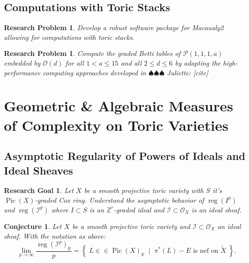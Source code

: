 \documentclass[11pt,reqno]{amsart}
\newtheorem{goal}[lemma]{Research Goal}
\newtheorem{problem}[lemma]{Research Problem}
\newtheorem{conjecture}[lemma]{Conjecture}
\theoremstyle{remark}
\newcommand{\reg}{\operatorname{reg}}
\newcommand{\Pic}{\operatorname{Pic}}
\newcommand{\RR}{\mathbb{R}}
\newcommand{\ZZ}{\mathbb{Z}}
\newcommand{\cI}{\mathcal{I}}
\newcommand{\cO}{\mathcal{O}}
\newcommand{\cP}{\mathcal{P}}
\newcommand{\juliette}[1]{{\color{red} \sf $\spadesuit\spadesuit\spadesuit$ Juliette: [#1]}}
\begin{document}
\subsection{Computations with Toric Stacks}

\begin{problem}\label{prob:toric-stacks-m2}
Develop a robust software package for \textit{Macaualy2} allowing for computations with toric stacks. 
\end{problem}

\begin{problem}
	Compute the graded Betti tables of $\cP(1,1,1,a)$ embedded by $\cO(d)$ for all $1<a \leq 15$ and all $2\leq d \leq 6$ by adapting the high-performance computing approaches developed in \juliette{cite}
	\end{problem}
	
\section{Geometric \& Algebraic Measures of Complexity on Toric Varieties}

 \subsection{Asymptotic Regularity of Powers of Ideals and Ideal Sheaves}
 
 \begin{goal}
 	Let $X$ be a smooth projective toric variety with $S$ it's $\Pic(X)$-graded Cox ring. Understand the asymptotic behavior of $\reg(I^p)$ and $\reg(\cI^p)$ where $I \subset S$ is an $\ZZ^r$-graded ideal and $\cI\subset \cO_{X}$ is an ideal sheaf.
\end{goal}
 
 \begin{conjecture}\label{conj:reg-ideal-sheaves}
 	Let $X$ be a smooth projective toric variety and $\cI \subset \cO_{X}$ an ideal sheaf. With the notation as above:
	\[
	\lim_{p\to \infty} \frac{\reg\left(\cI^p\right)_{\RR}}{p} = \left\{ \; L \in\in \Pic(X)_{\RR} \;\; \big| \;\; \pi^*(L)-E \text{ is nef on $\tilde{X}$} \;\right\}.
	\]
 \end{conjecture}
 
\end{document}
